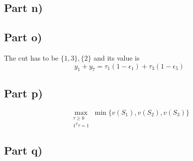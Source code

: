 \documentclass[10pt,a4paper]{article}
\begin{document}
\subsection*{Part n)}

\subsection*{Part o)}

The cut has to be $\{ 1, 3 \}, \{ 2 \}$ and its value is
\begin{equation*}
  y_{1} + y_{7} = \tau_{1} (1 - \epsilon_{1}) + \tau_{3} (1 - \epsilon_{5})
\end{equation*}

\subsection*{Part p)}

\begin{equation*}
  \max_{\substack{\tau \ge 0\\1^{T}\tau = 1}} \min \{ v(S_{1}), v(S_{2}), v(S_{3}) \}
\end{equation*}

\subsection*{Part q)}
\end{document}
